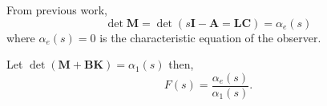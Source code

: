From previous work,
\[
\det\mathbf{M}=\det\left(s\mathbf{I}-\mathbf{A}=\mathbf{LC}\right)=\alpha_e(s)
\]
where $\alpha_e(s)=0$ is the characteristic equation of the observer.

Let $\det\left(\mathbf{M}+\mathbf{BK}\right)=\alpha_1(s)$ then,
\[
F(s)=\frac{\alpha_e(s)}{\alpha_1(s)}.
\]





\endinput

